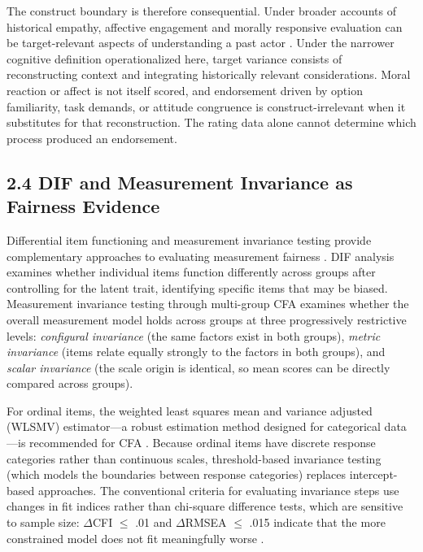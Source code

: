 \documentclass[PCJ,Unicode,screen,mode=plain]{cedram}
\begin{document}
The construct boundary is therefore consequential. Under broader accounts of
historical empathy, affective engagement and morally responsive evaluation can
be target-relevant aspects of understanding a past actor
\citep{Barton_Levstik2004Teaching,Endacott_Brooks2013An_Updated}. Under the narrower cognitive
definition operationalized here, target variance consists of reconstructing
context and integrating historically relevant considerations. Moral reaction
or affect is not itself scored, and endorsement driven by option familiarity,
task demands, or attitude congruence is construct-irrelevant when it substitutes
for that reconstruction. The rating data alone cannot determine which process
produced an endorsement.

\subsection*{2.4 DIF and Measurement Invariance as Fairness Evidence}\label{dif-and-measurement-invariance-as-fairness-evidence}

Differential item functioning and measurement invariance testing provide complementary approaches to evaluating measurement fairness \citep{Chen2007,Cheung2002,Finch2005}. DIF analysis examines whether individual items function differently across groups after controlling for the latent trait, identifying specific items that may be biased. Measurement invariance testing through multi-group CFA examines whether the overall measurement model holds across groups at three progressively restrictive levels: \emph{configural invariance} (the same factors exist in both groups), \emph{metric invariance} (items relate equally strongly to the factors in both groups), and \emph{scalar invariance} (the scale origin is identical, so mean scores can be directly compared across groups).

For ordinal items, the weighted least squares mean and variance
adjusted (WLSMV) estimator---a robust estimation method designed for
categorical data---is recommended for CFA \citep{Flora2004}.
Because ordinal items have discrete response categories rather than
continuous scales, threshold-based invariance testing (which models the
boundaries between response categories) replaces intercept-based
approaches. The conventional criteria for evaluating invariance steps use changes in fit indices rather than chi-square difference tests, which are sensitive to sample size: \(\Delta\)CFI \(\leq\) .01 and \(\Delta\)RMSEA \(\leq\) .015 indicate that the more constrained model does not fit meaningfully worse \citep{Chen2007,Cheung2002}.
\end{document}
